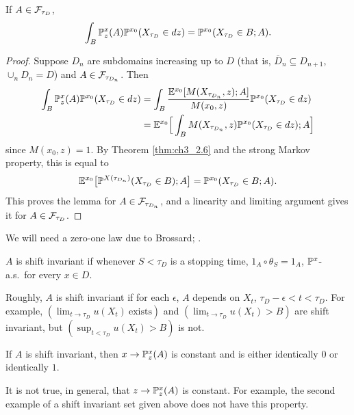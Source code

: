 \begin{proposition}\label{prop:ch3_2.7}
If $A \in \FC_{\tau_D}$,
\[
    \int_B \P_z^x(A)\P^{x_0}(X_{\tau_D} \in dz) = \P^{x_0}(X_{\tau_D} \in B; A).
\]
\end{proposition}

\begin{proof}
Suppose $D_n$ are subdomains increasing up to $D$ (that is, $\overline{D}_n \subseteq D_{n+1}$, $\cup_n D_n = D$) and $A \in \FC_{\tau_{D_n}}$. Then
\begin{align*}
    \int_B \P_z^x(A)\P^{x_0}(X_{\tau_D} \in dz) &= \int_B \frac{\E^{x_0}[M(X_{\tau_{D_n}},z); A]}{M(x_0,z)} \P^{x_0}(X_{\tau_D} \in dz) \\
    &= \E^{x_0}\Big[\int_B M(X_{\tau_{D_n}},z) \P^{x_0}(X_{\tau_D} \in dz); A\Big]
\end{align*}
since $M(x_0,z) = 1$. By Theorem \ref{thm:ch3_2.6} and the strong Markov property, this is equal to
\[
    \E^{x_0}\big[\P^{X(\tau_{D_n})}(X_{\tau_D} \in B); A\big] = \P^{x_0}(X_{\tau_D} \in B; A).
\]
This proves the lemma for $A \in \FC_{\tau_{D_n}}$, and a linearity and limiting argument gives it for $A \in \FC_{\tau_D}$.
\end{proof}

We will need a zero-one law due to Brossard; \cite[see][pp.~102-104]{Durrett1984}.

\begin{definition}\label{def:ch3_2.8}
$A$ is shift invariant if whenever $S < \tau_D$ is a stopping time, $1_A \circ \theta_S = 1_A$, $\P^x$-a.s.\ for every $x \in D$.
\end{definition}

Roughly, $A$ is shift invariant if for each $\epsilon$, $A$ depends on $X_t$, $\tau_D - \epsilon < t < \tau_D$. For example, $(\lim_{t\to\tau_D} u(X_t)~\text{exists})$ and $(\lim_{t\to\tau_D} u(X_t) > B)$ are shift invariant, but $(\sup_{t<\tau_D} u(X_t) > B)$ is not.

\begin{theorem}\label{thm:ch3_2.9}
If $A$ is shift invariant, then $x \to \P_z^x(A)$ is constant and is either identically $0$ or identically $1$.
\end{theorem}

It is not true, in general, that $z\to \P_z^x(A)$ is constant. For example, the second example of a shift invariant set given above does not have this property.

